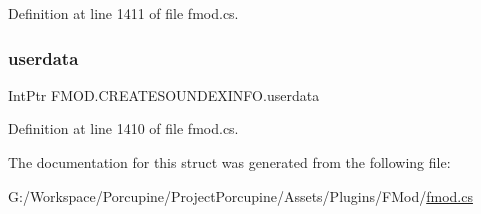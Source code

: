 Definition at line 1411 of file fmod.\+cs.

\mbox{\label{struct_f_m_o_d_1_1_c_r_e_a_t_e_s_o_u_n_d_e_x_i_n_f_o_a83788bafd6bae818692e619d5e6c2493}} 
\subsubsection{\texorpdfstring{userdata}{userdata}}
{\footnotesize\ttfamily Int\+Ptr F\+M\+O\+D.\+C\+R\+E\+A\+T\+E\+S\+O\+U\+N\+D\+E\+X\+I\+N\+F\+O.\+userdata}



Definition at line 1410 of file fmod.\+cs.



The documentation for this struct was generated from the following file\+:\begin{DoxyCompactItemize}
\item 
G\+:/\+Workspace/\+Porcupine/\+Project\+Porcupine/\+Assets/\+Plugins/\+F\+Mod/\hyperlink{fmod_8cs}{fmod.\+cs}\end{DoxyCompactItemize}
